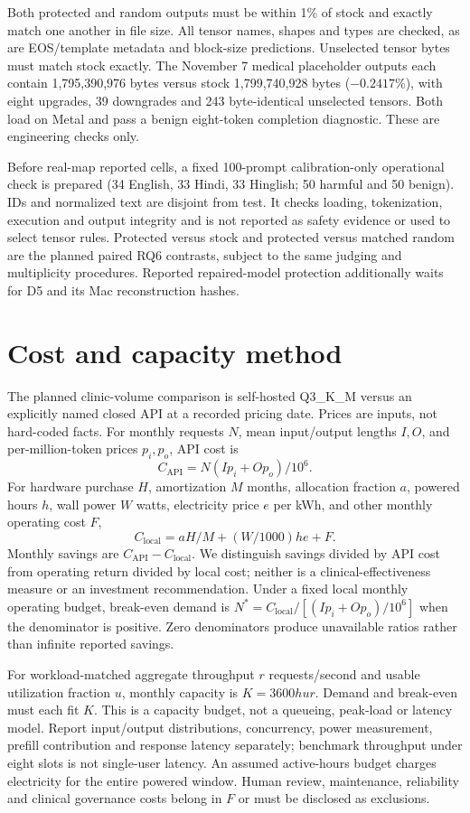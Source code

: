 \documentclass[11pt,a4paper]{article}
\begin{document}
Both protected and random outputs must be within 1\% of stock and exactly match one another in file size. All tensor names, shapes and types are checked, as are EOS/template metadata and block-size predictions. Unselected tensor bytes must match stock exactly. The November 7 medical placeholder outputs each contain 1,795,390,976 bytes versus stock 1,799,740,928 bytes ($-0.2417\%$), with eight upgrades, 39 downgrades and 243 byte-identical unselected tensors. Both load on Metal and pass a benign eight-token completion diagnostic. These are engineering checks only.

Before real-map reported cells, a fixed 100-prompt calibration-only operational check is prepared (34 English, 33 Hindi, 33 Hinglish; 50 harmful and 50 benign). IDs and normalized text are disjoint from test. It checks loading, tokenization, execution and output integrity and is not reported as safety evidence or used to select tensor rules. Protected versus stock and protected versus matched random are the planned paired RQ6 contrasts, subject to the same judging and multiplicity procedures. Reported repaired-model protection additionally waits for D5 and its Mac reconstruction hashes.

\clearpage
\section{Cost and capacity method}

The planned clinic-volume comparison is self-hosted Q3\_K\_M versus an explicitly named closed API at a recorded pricing date. Prices are inputs, not hard-coded facts. For monthly requests $N$, mean input/output lengths $I,O$, and per-million-token prices $p_i,p_o$, API cost is
\[
C_{\mathrm{API}}=N(Ip_i+Op_o)/10^6.
\]
For hardware purchase $H$, amortization $M$ months, allocation fraction $a$, powered hours $h$, wall power $W$ watts, electricity price $e$ per kWh, and other monthly operating cost $F$,
\[
C_{\mathrm{local}}=aH/M+(W/1000)he+F.
\]
Monthly savings are $C_{\mathrm{API}}-C_{\mathrm{local}}$. We distinguish savings divided by API cost from operating return divided by local cost; neither is a clinical-effectiveness measure or an investment recommendation. Under a fixed local monthly operating budget, break-even demand is $N^*=C_{\mathrm{local}}/[(Ip_i+Op_o)/10^6]$ when the denominator is positive. Zero denominators produce unavailable ratios rather than infinite reported savings.

For workload-matched aggregate throughput $r$ requests/second and usable utilization fraction $u$, monthly capacity is $K=3600hur$. Demand and break-even must each fit $K$. This is a capacity budget, not a queueing, peak-load or latency model. Report input/output distributions, concurrency, power measurement, prefill contribution and response latency separately; benchmark throughput under eight slots is not single-user latency. An assumed active-hours budget charges electricity for the entire powered window. Human review, maintenance, reliability and clinical governance costs belong in $F$ or must be disclosed as exclusions.
\end{document}
